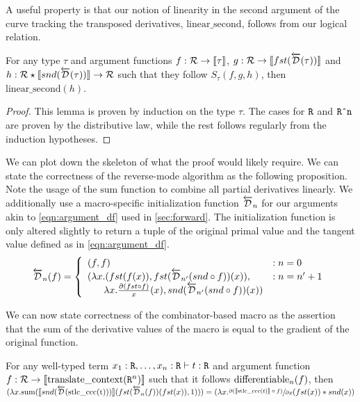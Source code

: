   A useful property is that our notion of linearity in the second argument of the curve tracking the transposed derivatives, $\text{linear\_second}$, follows from our logical relation.
  \begin{lemma}
    For any type $\tau$ and argument functions $f : \mathcal{R} \rightarrow \llbracket \tau \rrbracket$, $g : \mathcal{R} \rightarrow \llbracket fst(\overleftarrow{\mathcal{D}}(\tau))\rrbracket$ and $h : \mathcal{R} \star \llbracket snd(\overleftarrow{\mathcal{D}}(\tau)) \rrbracket \rightarrow \mathcal{R}$ such that they follow $S_\tau(f, g, h)$, then $\text{linear\_second}(h)$.
  \end{lemma}
  \begin{proof}
    This lemma is proven by induction on the type $\tau$.
    The cases for $\texttt{R}$ and $\texttt{R\^{}n}$ are proven by the distributive law, while the rest follows regularly from the induction hypotheses.
  \end{proof}

  We can plot down the skeleton of what the proof would likely require.
  We can state the correctness of the reverse-mode algorithm as the following proposition.
  Note the usage of the $\text{sum}$ function to combine all partial derivatives linearly.
  We additionally use a macro-specific initialization function $\overleftarrow{\mathcal{D}}_n$ for our arguments akin to \cref{eqn:argument_df} used in \cref{sec:forward}.
  The initialization function is only altered slightly to return a tuple of the original primal value and the tangent value defined as in \cref{eqn:argument_df}.
  \begin{equation*}
    \overleftarrow{\mathcal{D}}_n(f) =
      \left\{
        \begin{array}{ll}
          (f, f) & : n = 0 \\
          (\lambda x. (fst(f(x)), fst(\overleftarrow{\mathcal{D}}_{n'}(snd \circ f))(x)), & : n = n' + 1 \\
          \;\;\;\;\;\; \lambda x. \frac{\partial{(fst \circ f)}}{x}(x), snd(\overleftarrow{\mathcal{D}}_{n'}(snd\circ f))(x))
        \end{array}
      \right.
  \label{eqn:argument_df_rev}
  \end{equation*}

  We can now state correctness of the combinator-based macro as the assertion that the sum of the derivative values of the macro is equal to the gradient of the original function.
  \begin{proposition}
    For any well-typed term $x_1 : \texttt{R}, \dots, x_n : \texttt{R} \vdash t : \texttt{R}$ and argument function $f :  \mathcal{R} \rightarrow \llbracket \text{translate\_context}(\texttt{R}^n) \rrbracket$ such that it follows $\text{differentiable}_{n}(f)$, then $(\lambda x. \text{sum}(\llbracket snd(\overleftarrow{\mathcal{D}}(\text{stlc\_ccc(t)}))\rrbracket (fst(\overleftarrow{\mathcal{D}}_n(f)) (fst(x)), 1))) = (\lambda x. \sfrac{\partial{(\llbracket\text{stlc\_ccc}(t)\rrbracket \circ f)}}{\partial{x}}(fst(x)) * snd(x))$
  \end{proposition}

